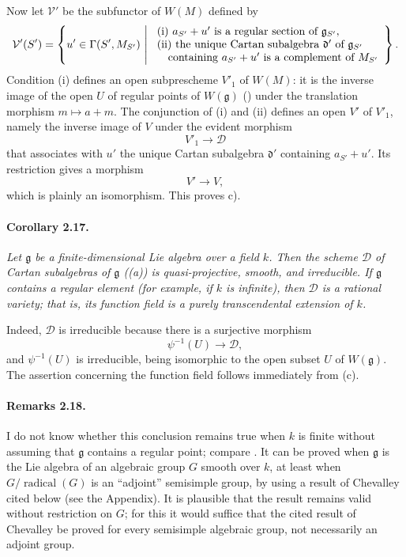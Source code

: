 Now let \(\mathcal V'\) be the subfunctor of \(W(M)\) defined by
\[
 \mathcal V'(S')
 =
 \left\{
   u'\in\Gamma(S',M_{S'})
   \ \middle|\
   \begin{array}{l}
   \textup{(i) }a_{S'}+u'\text{ is a regular section of }
     \mathfrak g_{S'},\\
   \textup{(ii) the unique Cartan subalgebra }\mathfrak d'
     \text{ of }\mathfrak g_{S'}\\
   \quad\text{containing }a_{S'}+u'
     \text{ is a complement of }M_{S'}
   \end{array}
 \right\}.
\]
Condition \textup{(i)} defines an open subprescheme \(V'_1\) of
\(W(M)\): it is the inverse image of the open \(U\) of regular
points of \(W(\mathfrak g)\) \textup{()} under the translation
morphism \(m\mapsto a+m\). The conjunction of \textup{(i)} and
\textup{(ii)} defines an open \(V'\) of \(V'_1\), namely the
inverse image of \(V\) under the evident morphism
\[
  V'_1\longrightarrow\mathcal D
\]
that associates with \(u'\) the unique Cartan subalgebra
\(\mathfrak d'\) containing \(a_{S'}+u'\). Its restriction gives
a morphism
\[
  V'\longrightarrow V,
\]
which is plainly an isomorphism. This proves \textup{c)}.

\paragraph{\textbf{Corollary 2.17.}}
{\itshape Let \(\mathfrak g\) be a finite-dimensional Lie algebra
over a field \(k\). Then the scheme \(\mathcal D\) of Cartan
subalgebras of \(\mathfrak g\) \textup{(\textup{(a)})} is
quasi-projective, smooth, and irreducible. If \(\mathfrak g\)
contains a regular element \textup{(for example, if \(k\) is
infinite)}, then \(\mathcal D\) is a rational variety; that is, its
function field is a purely transcendental extension of \(k\).}

Indeed, \(\mathcal D\) is irreducible because there is a surjective
morphism
\[
  \psi^{-1}(U)\longrightarrow\mathcal D,
\]
and \(\psi^{-1}(U)\) is irreducible, being isomorphic to the open
subset \(U\) of \(W(\mathfrak g)\). The assertion concerning the
function field follows immediately from \textup{(c)}.

\paragraph{\textbf{Remarks 2.18.}}
I do not know whether this conclusion remains true when \(k\) is
finite without assuming that \(\mathfrak g\) contains a regular
point; compare . It can be proved when \(\mathfrak g\) is the
Lie algebra of an algebraic group \(G\) smooth over \(k\), at least
when \(G/\operatorname{radical}(G)\) is an ``adjoint'' semisimple
group, by using a result of Chevalley cited below \textup{(see the
Appendix)}. It is plausible that the result remains valid without
restriction on \(G\); for this it would suffice that the cited
result of Chevalley be proved for every semisimple algebraic group,
not necessarily an adjoint group.
